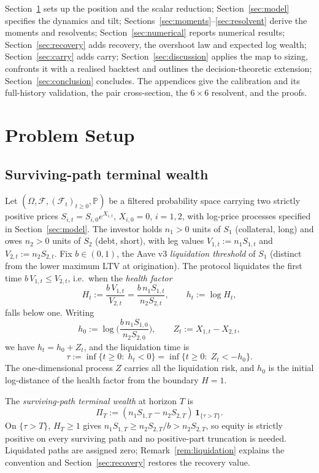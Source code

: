 \documentclass[11pt]{article}
\renewcommand{\P}{\mathbb{P}}
\newcommand{\F}{\mathcal{F}}
\newcommand{\one}{\mathbf{1}}
\theoremstyle{plain}
\theoremstyle{definition}
\theoremstyle{remark}
\begin{document}
Section~\ref{sec:setup} sets up the position and the scalar reduction; Section~\ref{sec:model}
specifies the dynamics and tilt; Sections~\ref{sec:moments}--\ref{sec:resolvent} derive the moments
and resolvents; Section~\ref{sec:numerical} reports numerical results; Section~\ref{sec:recovery}
adds recovery, the overshoot law and expected log wealth; Section~\ref{sec:carry} adds carry;
Section~\ref{sec:discussion} applies the map to sizing, confronts it with a realised backtest and
outlines the decision-theoretic extension;
Section~\ref{sec:conclusion} concludes. The appendices give the calibration and its full-history
validation, the pair cross-section, the $6\times6$ resolvent, and the proofs.

\section{Problem Setup}\label{sec:setup}

\subsection{Surviving-path terminal wealth}
Let $(\Omega,\F,(\F_t)_{t\ge 0},\P)$ be a filtered probability space carrying two strictly positive
prices $S_{i,t}=S_{i,0}e^{X_{i,t}}$, $X_{i,0}=0$, $i=1,2$, with log-price processes specified in
Section~\ref{sec:model}. The investor holds $n_1>0$ units of $S_1$ (collateral, long) and owes
$n_2>0$ units of $S_2$ (debt, short), with leg values $V_{1,t}:=n_1S_{1,t}$ and
$V_{2,t}:=n_2S_{2,t}$. Fix $b\in(0,1)$, the Aave v3 \emph{liquidation threshold} of $S_1$ (distinct
from the lower maximum LTV at origination). The protocol liquidates the first time
$b\,V_{1,t}\le V_{2,t}$, i.e.\ when the \emph{health factor}
\begin{equation}\label{eq:health-factor}
H_t := \frac{b\,V_{1,t}}{V_{2,t}} = \frac{b\,n_1 S_{1,t}}{n_2 S_{2,t}},
\qquad
h_t := \log H_t,
\end{equation}
falls below one. Writing
\[
h_0:=\log\!\Big(\frac{b\,n_1S_{1,0}}{n_2S_{2,0}}\Big),
\qquad
Z_t:=X_{1,t}-X_{2,t},
\]
we have $h_t=h_0+Z_t$, and the liquidation time is
\[
\tau:=\inf\{t\ge 0:\;h_t<0\}=\inf\{t\ge 0:\; Z_t<-h_0\}.
\]
The one-dimensional process $Z$ carries all the liquidation risk, and $h_0$ is the initial
log-distance of the health factor from the boundary $H=1$.

The \emph{surviving-path terminal wealth} at horizon $T$ is
\[
\Pi_T:=(n_1S_{1,T}-n_2S_{2,T})\,\one_{\{\tau>T\}}.
\]
On $\{\tau>T\}$, $H_T\ge1$ gives $n_1S_{1,T}\ge n_2S_{2,T}/b>n_2S_{2,T}$, so equity is strictly
positive on every surviving path and no positive-part truncation is needed. Liquidated paths are
assigned zero; Remark~\ref{rem:liquidation} explains the convention and Section~\ref{sec:recovery}
restores the recovery value.
\end{document}
